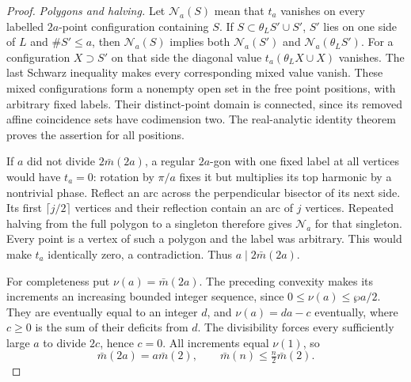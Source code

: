 \documentclass[11pt,letterpaper,reqno]{amsart}
\theoremstyle{definition}
\theoremstyle{remark}
\begin{document}
\begin{proof}
\emph{Polygons and halving.}
Let $\mathcal N_a(S)$ mean that $t_a$ vanishes on
every labelled $2a$-point configuration containing
$S$.  If $S\subset\theta_LS'\cup S'$, $S'$ lies
on one side of $L$ and $\#S'\le a$, then
$\mathcal N_a(S)$ implies both
$\mathcal N_a(S')$ and $\mathcal N_a(\theta_LS')$.
For a configuration $X\supset S'$ on that side the
diagonal value $t_a(\theta_LX\cup X)$ vanishes.
The last Schwarz inequality makes every corresponding
mixed value vanish.  These mixed configurations form
a nonempty open set in the free point positions,
with arbitrary fixed labels.  Their distinct-point
domain is connected, since its removed affine
coincidence sets have codimension two.  The
real-analytic identity theorem proves the assertion
for all positions.

If $a$ did not divide $2\bar m(2a)$, a regular
$2a$-gon with one fixed label at all vertices would
have $t_a=0$: rotation by $\pi/a$ fixes it but
multiplies its top harmonic by a nontrivial phase.
Reflect an arc across the perpendicular bisector of
its next side.  Its first $\lceil j/2\rceil$ vertices
and their reflection contain an arc of $j$ vertices.
Repeated halving from the full polygon to a singleton
therefore gives $\mathcal N_a$ for that singleton.
Every point is a vertex of such a polygon and the
label was arbitrary.  This would make $t_a$ identically
zero, a contradiction.  Thus $a\mid2\bar m(2a)$.

For completeness put $\nu(a)=\bar m(2a)$.
The preceding convexity makes its increments an
increasing bounded integer sequence, since
$0\le\nu(a)\le\wp a/2$.  They are eventually equal
to an integer $d$, and $\nu(a)=da-c$ eventually,
where $c\ge0$ is the sum of their deficits from $d$.
The divisibility forces every sufficiently large
$a$ to divide $2c$, hence $c=0$.  All increments
equal $\nu(1)$, so
\[
 \bar m(2a)=a\bar m(2),\qquad
                  \bar m(n)\le\tfrac n2\bar m(2).
\]


\end{proof}
\end{document}
